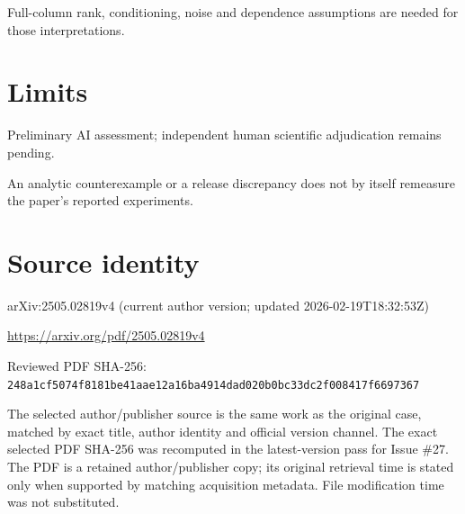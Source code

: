 \documentclass[11pt]{article}
\begin{document}
Full-column rank, conditioning, noise and dependence assumptions are needed for those interpretations.

\section*{Limits}

Preliminary AI assessment; independent human scientific adjudication remains pending.\par

An analytic counterexample or a release discrepancy does not by itself remeasure the paper’s reported experiments.\par

\section*{Source identity}

arXiv:2505.02819v4 (current author version; updated 2026-02-19T18:32:53Z)

\url{https://arxiv.org/pdf/2505.02819v4}

Reviewed PDF SHA-256: \nolinkurl{248a1cf5074f8181be41aae12a16ba4914dad020b0bc33dc2f008417f6697367}

The selected author/publisher source is the same work as the original case, matched by exact title, author identity and official version channel. The exact selected PDF SHA-256 was recomputed in the latest-version pass for Issue \#27. The PDF is a retained author/publisher copy; its original retrieval time is stated only when supported by matching acquisition metadata. File modification time was not substituted.
\end{document}
